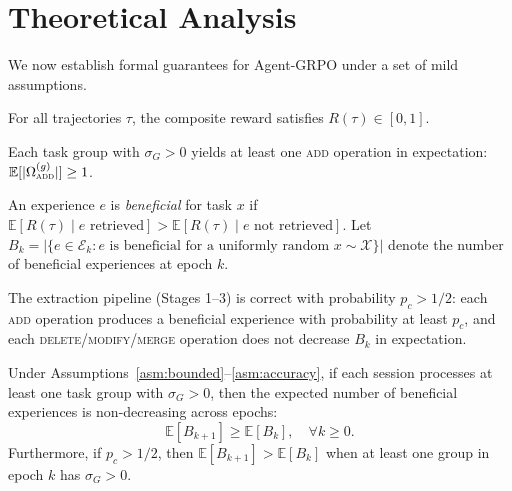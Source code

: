 \section{Theoretical Analysis}

\label{sec:theory}

We now establish formal guarantees for Agent-GRPO under a set of mild
assumptions.

\begin{assumption}
\label{asm:bounded}
For all trajectories $\tau$, the composite reward satisfies $R(\tau) \in [0, 1]$.
\end{assumption}

\begin{assumption}
\label{asm:info}
Each task group with $\sigma_G > 0$ yields at least one \textsc{add} operation
in expectation: $\mathbb{E}[|\Omega^{(g)}_{\textsc{add}}|] \geq 1$.
\end{assumption}

\begin{assumption}
\label{asm:relevance}
An experience $e$ is \emph{beneficial} for task $x$ if $\mathbb{E}[R(\tau) \mid e \text{ retrieved}] > \mathbb{E}[R(\tau) \mid e \text{ not retrieved}]$.
Let $B_k = |\{e \in \mathcal{E}_k : e \text{ is beneficial for a uniformly random } x \sim \mathcal{X}\}|$
denote the number of beneficial experiences at epoch $k$.
\end{assumption}

\begin{assumption}
\label{asm:accuracy}
The extraction pipeline (Stages 1--3) is correct with probability $p_c > 1/2$:
each \textsc{add} operation produces a beneficial experience with probability
at least $p_c$, and each \textsc{delete}/\textsc{modify}/\textsc{merge} operation
does not decrease $B_k$ in expectation.
\end{assumption}

\begin{theorem}
\label{thm:monotone}
Under Assumptions~\ref{asm:bounded}--\ref{asm:accuracy}, if each session
processes at least one task group with $\sigma_G > 0$, then the expected number
of beneficial experiences is non-decreasing across epochs:
\begin{equation}
    \mathbb{E}[B_{k+1}] \geq \mathbb{E}[B_k], \quad \forall k \geq 0.
    \label{eq:monotone}
\end{equation}
Furthermore, if $p_c > 1/2$, then $\mathbb{E}[B_{k+1}] > \mathbb{E}[B_k]$
when at least one group in epoch $k$ has $\sigma_G > 0$.
\end{theorem}

